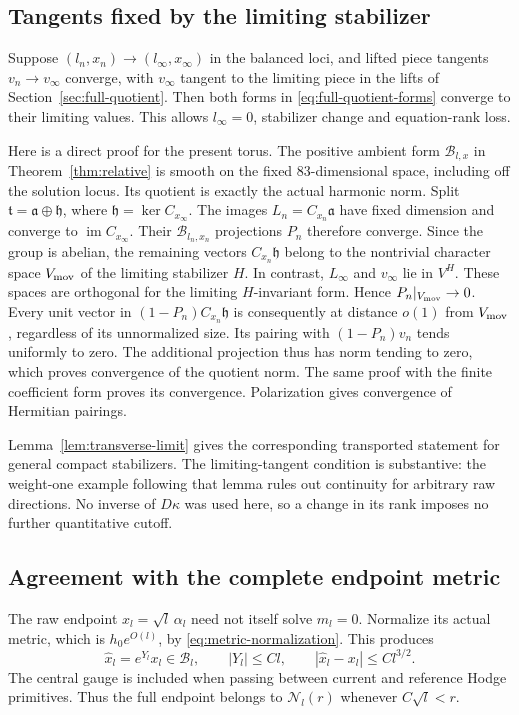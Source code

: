 \documentclass[11pt]{amsart}
\theoremstyle{definition}
\theoremstyle{remark}
\newcommand{\cB}{\mathcal B}
\newcommand{\cN}{\mathcal N}
\newcommand{\im}{\operatorname{im}}
\begin{document}
\subsection{Tangents fixed by the limiting stabilizer}
Suppose $(l_n,x_n)\to(l_\infty,x_\infty)$ in the balanced loci,
and lifted piece tangents $v_n\to v_\infty$ converge, with
$v_\infty$ tangent to the limiting piece in the lifts of
Section~\ref{sec:full-quotient}. Then both forms in
\eqref{eq:full-quotient-forms} converge to their limiting values.
This allows $l_\infty=0$, stabilizer change and equation-rank loss.

Here is a direct proof for the present torus. The positive ambient
form $\mathcal B_{l,x}$ in Theorem~\ref{thm:relative} is smooth on
the fixed $83$-dimensional space, including off the solution locus.
Its quotient is exactly the actual harmonic norm. Split
$\mathfrak t=\mathfrak a\oplus\mathfrak h$, where
$\mathfrak h=\ker C_{x_\infty}$. The images
$L_n=C_{x_n}\mathfrak a$ have fixed dimension and converge to
$\im C_{x_\infty}$. Their $\mathcal B_{l_n,x_n}$ projections
$P_n$ therefore converge. Since the group is abelian, the remaining
vectors $C_{x_n}\mathfrak h$ belong to the nontrivial character
space $V_{\rm mov}$ of the limiting stabilizer $H$. In contrast,
$L_\infty$ and $v_\infty$ lie in $V^H$. These spaces are orthogonal
for the limiting $H$-invariant form. Hence $P_n|_{V_{\rm mov}}\to0$.
Every unit vector in $(1-P_n)C_{x_n}\mathfrak h$ is consequently
at distance $o(1)$ from $V_{\rm mov}$, regardless of its
unnormalized size. Its pairing with $(1-P_n)v_n$ tends uniformly
to zero. The additional projection thus has norm tending to zero,
which proves convergence of the quotient norm. The same proof with
the finite coefficient form proves its convergence. Polarization gives
convergence of Hermitian pairings.

Lemma~\ref{lem:transverse-limit} gives the corresponding transported
statement for general compact stabilizers. The limiting-tangent
condition is substantive: the weight-one example following that lemma
rules out continuity for arbitrary raw directions. No inverse of
$D\kappa$ was used here, so a change in its rank imposes no further
quantitative cutoff.

\subsection{Agreement with the complete endpoint metric}
The raw endpoint $x_l=\sqrt l\,\alpha_l$ need not itself solve
$m_l=0$. Normalize its actual metric, which is $h_0e^{O(l)}$, by
\eqref{eq:metric-normalization}. This produces
\begin{equation}\label{eq:corrected-endpoint}
 \widehat x_l=e^{Y_l}x_l\in\cB_l,\qquad
 |Y_l|\le Cl,\qquad |\widehat x_l-x_l|\le Cl^{3/2}.
\end{equation}
The central gauge is included when passing between current and reference
Hodge primitives. Thus the full endpoint belongs to $\cN_l(r)$
whenever $C\sqrt l<r$.
\end{document}
